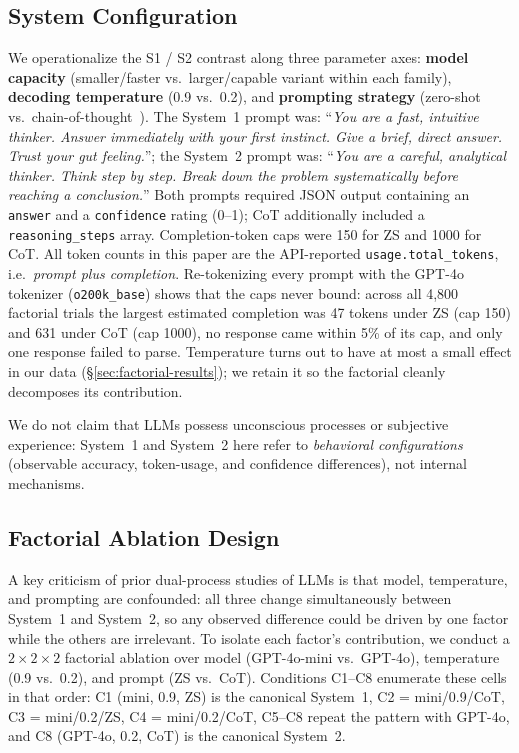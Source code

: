 \documentclass[conference]{IEEEtran}
\begin{document}
\subsection{System Configuration}

We operationalize the S1 / S2 contrast along three parameter axes: \textbf{model capacity} (smaller/faster vs.\ larger/capable variant within each family), \textbf{decoding temperature} (0.9 vs.\ 0.2), and \textbf{prompting strategy} (zero-shot vs.\ chain-of-thought~\cite{Wei2022}). The System~1 prompt was: ``\textit{You are a fast, intuitive thinker. Answer immediately with your first instinct. Give a brief, direct answer. Trust your gut feeling.}''; the System~2 prompt was: ``\textit{You are a careful, analytical thinker. Think step by step. Break down the problem systematically before reaching a conclusion.}'' Both prompts required JSON output containing an \texttt{answer} and a \texttt{confidence} rating (0--1); CoT additionally included a \texttt{reasoning\_steps} array. Completion-token caps were 150 for ZS and 1000 for CoT. All token counts in this paper are the API-reported \texttt{usage.total\_tokens}, i.e.\ \textit{prompt plus completion}. Re-tokenizing every prompt with the GPT-4o tokenizer (\texttt{o200k\_base}) shows that the caps never bound: across all 4{,}800 factorial trials the largest estimated completion was 47 tokens under ZS (cap 150) and 631 under CoT (cap 1000), no response came within 5\% of its cap, and only one response failed to parse. Temperature turns out to have at most a small effect in our data (\S\ref{sec:factorial-results}); we retain it so the factorial cleanly decomposes its contribution.

We do not claim that LLMs possess unconscious processes or subjective experience: System~1 and System~2 here refer to \textit{behavioral configurations} (observable accuracy, token-usage, and confidence differences), not internal mechanisms.

\subsection{Factorial Ablation Design}
\label{sec:factorial}

A key criticism of prior dual-process studies of LLMs is that model, temperature, and prompting are confounded: all three change simultaneously between System~1 and System~2, so any observed difference could be driven by one factor while the others are irrelevant. To isolate each factor's contribution, we conduct a $2 \times 2 \times 2$ factorial ablation over model (GPT-4o-mini vs.\ GPT-4o), temperature (0.9 vs.\ 0.2), and prompt (ZS vs.\ CoT). Conditions C1--C8 enumerate these cells in that order: C1 (mini, 0.9, ZS) is the canonical System~1, C2 = mini/0.9/CoT, C3 = mini/0.2/ZS, C4 = mini/0.2/CoT, C5--C8 repeat the pattern with GPT-4o, and C8 (GPT-4o, 0.2, CoT) is the canonical System~2.
\end{document}

